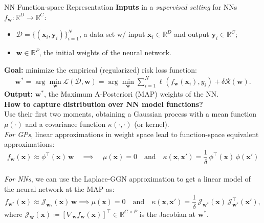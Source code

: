 \documentclass[final,12pt]{beamer}
\newcommand{\mbf}[1]{\mathbf{#1}}
\newcommand{\dataset}{\ensuremath{\mathcal{D}}}
\newcommand{\inputDomain}{\ensuremath{\mathbb{R}^{D}}}
\newcommand{\outputDomain}{\ensuremath{\mathbb{R}^{C}}}
\newcommand{\weights}{\ensuremath{\mathbf{w}}}
\newcommand{\T}{\top}
\newcommand{\vx}{\mbf{x}}
\newcommand{\vy}{\mbf{y}}
\newcommand{\vw}{\mbf{w}}
\newcommand{\Jac}[2]{\mathcal{J}_{#1}(#2)}
\newcommand{\JacT}[2]{\mathcal{J}_{#1}^\top(#2)}
\newcommand{\R}{\mathbb{R}}
\newlength{\colwidth}
\begin{document}
\begin{frame}[t]
\begin{columns}[t]
\begin{column}{\colwidth}
  \begin{block}{NN Function-space Representation}
  \alert{\bf Inputs} in a {\it supervised setting} for NNs $f_\mathbf{w}: \inputDomain \to \outputDomain$:\
  \begin{itemize}
  \item $\dataset = \{(\vx_{i} , \vy_{i})\}_{i=1}^{N}$, a data set w/ input $\vx_i \in \inputDomain$ and output $\vy_i \in \outputDomain$;
  \item $\weights \in \R^{P}$, the initial weights of the neural network.
  \end{itemize}
\alert{\bf Goal: }
  minimize the empirical (regularized) risk loss function:
\begin{align} 
  \weights^{*} =  \arg \min_{\weights} \mathcal{L}(\dataset,\weights) \nonumber
     = \arg \min_{\weights} \textstyle\sum_{i=1}^{N} \ell(f_\weights(\mathbf{x}_{i}), y_i) + \delta \mathcal{R}(\weights).
 \end{align}
\alert{\bf Output:} $\weights^*$, the Maximum A-Posteriori (MAP) weights of the NN.\\[0.5cm]

\alert{\bf How to capture distribution over NN model functions?}	\\
Use their first two moments, obtaining a Gaussian process with a \alert{mean function $\mu(\cdot)$} and a \alert{covariance function $\kappa(\cdot,\cdot)$} (or kernel). \\
{\it For GPs}, linear approximations in weight space lead to function-space equivalent approximations:
\begin{equation*}
	f_\weights(\vx) \approx 
\phi^\top\!(\vx) \, \vw \quad\implies\quad \mu(\vx) = 0 \quad \text{and} \quad \kappa(\vx, \vx') = \frac{1}{\delta} \, \phi^\T\!(\vx) \, \phi(\vx')
\end{equation*}\\
{\it For NNs}, we can use the \alert{Laplace-GGN approximation} to get a linear model of the neural network at the MAP as:
\begin{equation*}
	f_{\weights^*}(\vx) \approx \Jac{\weights_*}{\vx} \, \weights \implies   \mu(\vx) =  0 \quad \text{and} \quad
  \kappa(\vx, \vx')
  = \frac{1}{\delta} \, \Jac{\weights^*}{\vx} \, \JacT{\weights^*}{\vx'}, 
\end{equation*}
where $\Jac{\weights}{\vx} \coloneqq \left[ \nabla_\weights f_\weights(\vx)\right]^\top \in \R^{C \times P}$ is the Jacobian at $\weights^*$.
\end{block}
\end{column}


\end{columns}
\end{frame}
\end{document}
